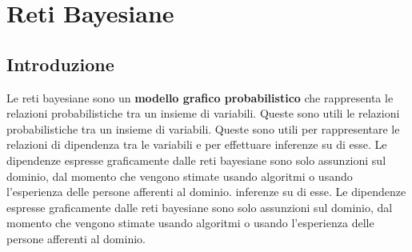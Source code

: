 \chapter{Reti Bayesiane} \label{cap:RetiBayesiane}
\section{Introduzione}
Le reti bayesiane sono un \textbf{modello grafico probabilistico} che rappresenta
le relazioni probabilistiche tra un insieme di variabili. Queste sono utili
le relazioni probabilistiche tra un insieme di variabili. Queste sono utili
per rappresentare le relazioni di dipendenza tra le variabili e per effettuare
inferenze su di esse. Le dipendenze espresse graficamente dalle reti bayesiane
sono solo assunzioni sul dominio, dal momento che vengono stimate usando
algoritmi o usando l'esperienza delle persone afferenti al dominio.
inferenze su di esse. Le dipendenze espresse graficamente dalle reti bayesiane
sono solo assunzioni sul dominio, dal momento che vengono stimate usando
algoritmi o usando l'esperienza delle persone afferenti al dominio.

